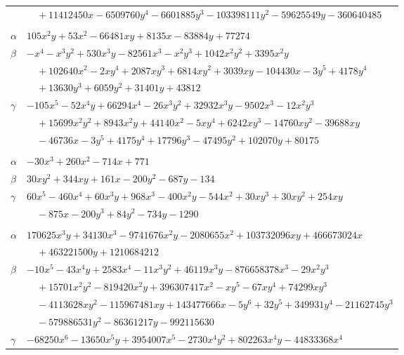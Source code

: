 \documentclass[11pt]{article}
\begin{document}
\begin{longtable}{@{}ll@{}}
 & $\quad +11412450x-6509760y^{4}-6601885y^{3}-103398111y^{2}-59625549y-360640485$\\
\addlinespace[3pt]
\multicolumn{2}{@{}l}{$\{i,j\}=\{15,104\}$, $k_{ij}=2\cdot 3^{3}\cdot 7\cdot 31^{2}$}\\
$\alpha$ & $105x^{2}y+53x^{2}-66481xy+8135x-83884y+77274$\\
$\beta$ & $-x^{4}-x^{3}y^{2}+530x^{3}y-82561x^{3}-x^{2}y^{3}+1042x^{2}y^{2}+3395x^{2}y$\\
 & $\quad +102640x^{2}-2xy^{4}+2087xy^{3}+6814xy^{2}+3039xy-104430x-3y^{5}+4178y^{4}$\\
 & $\quad +13630y^{3}+6059y^{2}+31401y+43812$\\
$\gamma$ & $-105x^{5}-52x^{4}y+66294x^{4}-26x^{3}y^{2}+32932x^{3}y-9502x^{3}-12x^{2}y^{3}$\\
 & $\quad +15699x^{2}y^{2}+8943x^{2}y+44140x^{2}-5xy^{4}+6242xy^{3}-14760xy^{2}-39688xy$\\
 & $\quad -46736x-3y^{5}+4175y^{4}+17796y^{3}-47495y^{2}+102070y+80175$\\
\addlinespace[3pt]
\multicolumn{2}{@{}l}{$\{i,j\}=\{15,105\}$, $k_{ij}=3\cdot 7^{2}\cdot 13$}\\
$\alpha$ & $-30x^{3}+260x^{2}-714x+771$\\
$\beta$ & $30xy^{2}+344xy+161x-200y^{2}-687y-134$\\
$\gamma$ & $60x^{5}-460x^{4}+60x^{3}y+968x^{3}-400x^{2}y-544x^{2}+30xy^{3}+30xy^{2}+254xy$\\
 & $\quad -875x-200y^{3}+84y^{2}-734y-1290$\\
\addlinespace[3pt]
\multicolumn{2}{@{}l}{$\{i,j\}=\{15,140\}$, $k_{ij}=2^{2}\cdot 3^{3}\cdot 5^{2}\cdot 7^{2}\cdot 13\cdot 31^{2}$}\\
$\alpha$ & $170625x^{3}y+34130x^{3}-9741676x^{2}y-2080655x^{2}+103732096xy+466673024x$\\
 & $\quad +463221500y+1210684212$\\
$\beta$ & $-10x^{5}-43x^{4}y+2583x^{4}-11x^{3}y^{2}+46119x^{3}y-876658378x^{3}-29x^{2}y^{3}$\\
 & $\quad +15701x^{2}y^{2}-819420x^{2}y+396307417x^{2}-xy^{5}-67xy^{4}+74299xy^{3}$\\
 & $\quad -4113628xy^{2}-115967481xy+143477666x-5y^{6}+32y^{5}+349931y^{4}-21162745y^{3}$\\
 & $\quad -579886531y^{2}-86361217y-992115630$\\
$\gamma$ & $-68250x^{6}-13650x^{5}y+3954007x^{5}-2730x^{4}y^{2}+802263x^{4}y-44833368x^{4}$\\

\end{longtable}
\end{document}
